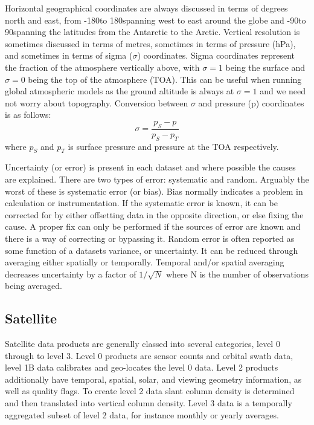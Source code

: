  Horizontal geographical coordinates are always discussed in terms of degrees north and east, from -180\degr to 180\degr spanning west to east around the globe and -90\degr to 90\degr spanning the latitudes from the Antarctic to the Arctic.
  Vertical resolution is sometimes discussed in terms of metres, sometimes in terms of pressure (hPa), and sometimes in terms of sigma ($\sigma$) coordinates.
  Sigma coordinates represent the fraction of the atmosphere vertically above, with $\sigma = 1$ being the surface and $\sigma = 0$ being the top of the atmosphere (TOA).
  This can be useful when running global atmospheric models as the ground altitude is always at $\sigma=1$ and we need not worry about topography.
  Conversion between $\sigma$ and pressure (p) coordinates is as follows:
  \begin{equation}
    \label{Model:datasets:eqn_sigma_pressure}
    \sigma = \frac{p_{S} - p}{p_{S}-p_{T}}
  \end{equation}
  where $p_{S}$ and $p_{T}$ is surface pressure and pressure at the TOA respectively.
  
  Uncertainty (or error) is present in each dataset and where possible the causes are explained.
  There are two types of error: systematic and random.
  Arguably the worst of these is systematic error (or bias).
  Bias normally indicates a problem in calculation or instrumentation.
  If the systematic error is known, it can be corrected for by either offsetting data in the opposite direction, or else fixing the cause.
  A proper fix can only be performed if the sources of error are known and there is a way of correcting or bypassing it.
  Random error is often reported as some function of a datasets variance, or uncertainty.
  It can be reduced through averaging either spatially or temporally. 
  Temporal and/or spatial averaging decreases uncertainty by a factor of $1/\sqrt{N}$ where N is the number of observations being averaged.
  
  \subsection{Satellite}
  \label{Model:datasets:satellite}
    Satellite data products are generally classed into several categories, level 0 through to level 3. Level 0 products are sensor counts and orbital swath data, level 1B data calibrates and geo-locates the level 0 data. 
    Level 2 products additionally have temporal, spatial, solar, and viewing geometry information, as well as quality flags.
    To create level 2 data slant column density is determined and then translated into vertical column density. 
    Level 3 data is a temporally aggregated subset of level 2 data, for instance monthly or yearly averages.
    
